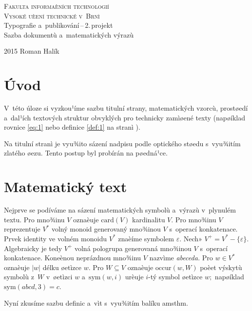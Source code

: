 \documentclass[11pt, a4paper]{article}
\theoremstyle{plain}
\theoremstyle{definition}
\theoremstyle{plain}
\begin{document}
\thispagestyle{empty} %
\setcounter{page}{0} %

\begin{center}
  \Huge
  \textsc{Fakulta informaèních technologií\\[-4mm]Vysoké uèení technické v~Brnì\\}
  \LARGE Typografie a~publikování\,--\,2.\,projekt\\[-2mm]Sazba dokumentù a~matematických výrazù
\end{center}
{\Large 2015 \hfill Roman Halík}

\newpage
\twocolumn

\section*{Úvod} \label{sec:uvod}
  V~této úloze si vyzkou¹íme sazbu titulní strany, matematických vzorcù, prostøedí a~dal¹ích textových struktur obvyklých pro technicky zamìøené texty (napøíklad rovnice \eqref{eq:1} nebo definice \ref{def:1} na stranì \pageref{sec:uvod}).

  Na titulní stranì je vyu¾ito sázení nadpisu podle optického støedu s~vyu¾itím zlatého øezu. Tento postup byl probírán na pøedná¹ce.

  \section {Matematický text}
  Nejprve se podíváme na sázení matematických symbolù a~výrazù v~plynulém textu. Pro mno¾inu $V$ oznaèuje $\mathrm{card}(V)$ kardinalitu $V$.
  Pro mno¾inu $V$ reprezentuje $V^*$ volný monoid generovaný mno¾inou $V$ s~operací konkatenace.
  Prvek identity ve volném monoidu $V^*$ znaèíme symbolem $\varepsilon$.
  Nech» $V^+ = V^* - \{ \varepsilon \}$. Algebraicky je tedy $V^+$ volná pologrupa generovaná mno¾inou $V$ s~operací konkatenace.
  Koneènou neprázdnou mno¾inu $V$ nazvìme \emph{abeceda. }
  Pro $w \in V^*$ oznaèuje $|w|$ délku øetìzce $w$. Pro $W \subseteq V$ oznaèuje $\mathrm{occur}(w,W)$ poèet výskytù symbolù z~$W$ v~øetìzci $w$ a~$\mathrm{sym}(w,i)$ urèuje $i$-tý symbol øetìzce $w;$ napøíklad $\mathrm{sym}(abcd,3) = c$.
  
  Nyní zkusíme sazbu definic a~vìt s~vyu¾itím balíku {\selectfont amsthm}.
\end{document}
